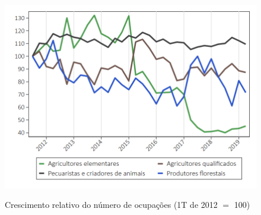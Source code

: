 \documentclass[8pt]{beamer}
\begin{document}
\begin{frame}[label=_graph_2]
\textit{\hyperlink{_graph_2}{}}
\begin{figure}
  \centering
  \includegraphics[width=.85\linewidth]{./../analysis/output/_graph_2.png}
  \label{_importancia_relativa}
  \caption{{Crescimento relativo do número de ocupações (1T de 2012 $=$ 100)}}
\end{figure}
\end{frame}
\end{document}

